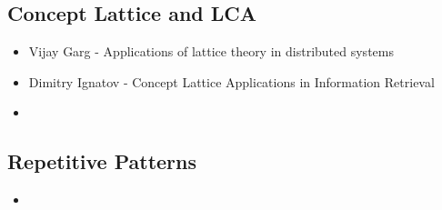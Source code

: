 \subsection{Concept Lattice and LCA}


\begin{itemize}
\item Vijay Garg - Applications of lattice theory in distributed systems

\item Dimitry Ignatov \cite{ignatov} - Concept Lattice Applications in Information Retrieval

\item \cite{clbook} \cite{clconst} \cite{bender05} \citep{latticeForDistConst} \cite{diff-myers}
\end{itemize}

\subsection{Repetitive Patterns}


\begin{itemize}
\item \cite{kmruse} \cite{kmr} \cite{nakamura_fast_2013} \cite{crochemore_jewels_2002} \citep{Crochemore:1994:TA:199269}
\end{itemize}


